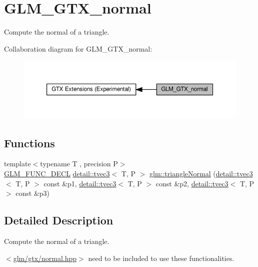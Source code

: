 \hypertarget{group__gtx__normal}{}\section{G\+L\+M\+\_\+\+G\+T\+X\+\_\+normal}
\label{group__gtx__normal}


Compute the normal of a triangle.  


Collaboration diagram for G\+L\+M\+\_\+\+G\+T\+X\+\_\+normal\+:\nopagebreak
\begin{figure}[H]
\begin{center}
\leavevmode
\includegraphics[width=350pt]{group__gtx__normal}
\end{center}
\end{figure}
\subsection*{Functions}
\begin{DoxyCompactItemize}
\item 
{\footnotesize template$<$typename T , precision P$>$ }\\\hyperlink{setup_8hpp_ab2d052de21a70539923e9bcbf6e83a51}{G\+L\+M\+\_\+\+F\+U\+N\+C\+\_\+\+D\+E\+CL} \hyperlink{structglm_1_1detail_1_1tvec3}{detail\+::tvec3}$<$ T, P $>$ \hyperlink{group__gtx__normal_gadd95b70793270eaeec13e2e8788b71d2}{glm\+::triangle\+Normal} (\hyperlink{structglm_1_1detail_1_1tvec3}{detail\+::tvec3}$<$ T, P $>$ const \&p1, \hyperlink{structglm_1_1detail_1_1tvec3}{detail\+::tvec3}$<$ T, P $>$ const \&p2, \hyperlink{structglm_1_1detail_1_1tvec3}{detail\+::tvec3}$<$ T, P $>$ const \&p3)
\end{DoxyCompactItemize}


\subsection{Detailed Description}
Compute the normal of a triangle. 

$<$\hyperlink{normal_8hpp}{glm/gtx/normal.\+hpp}$>$ need to be included to use these functionalities. 

